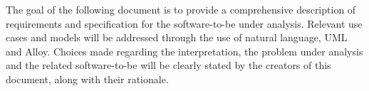 \documentclass[../../main.tex]{subfiles}
\begin{document}
The goal of the following document is to provide a comprehensive description of requirements and specification for the software-to-be under analysis. Relevant use cases and models will be addressed through the use of natural language, UML and Alloy. Choices made regarding the interpretation, the problem under analysis and the related software-to-be will be clearly stated by the creators of this document, along with their rationale.
\end{document}
